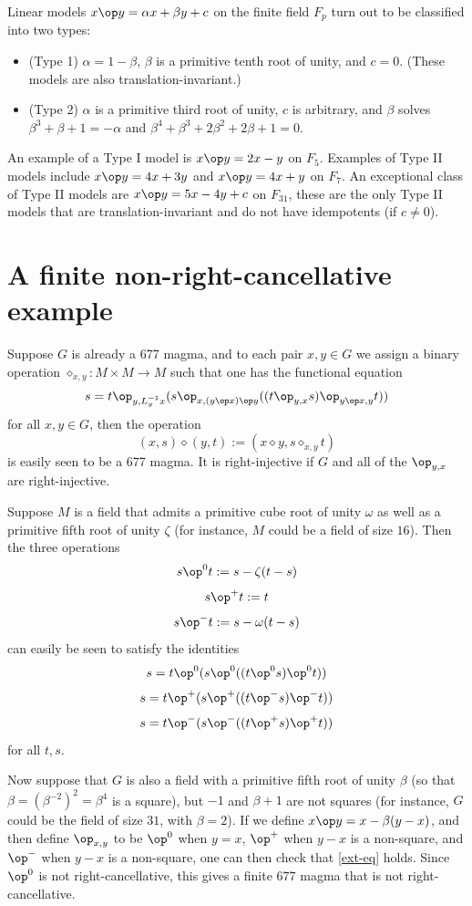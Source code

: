 Linear models $x \op y = \alpha x + \beta y + c$ on the finite field $F_p$ turn out to be classified into two types:
\begin{itemize}
\item (Type 1) $\alpha=1-\beta$, $\beta$ is a primitive tenth root of unity, and $c=0$.  (These models are also translation-invariant.)
\item (Type 2) $\alpha$ is a primitive third root of unity, $c$ is arbitrary, and $\beta$ solves $\beta^3+\beta+1=-\alpha$ and $\beta^4+\beta^3+2\beta^2+2\beta+1=0$.
\end{itemize}
An example of a Type I model is $x \op y = 2x-y$ on $F_5$.  Examples of Type II models include $x \op y = 4x+3y$ and $x \op y = 4x+y$ on $F_7$.  An exceptional class of Type II models are $x \op y = 5x-4y+c$ on $F_{31}$, these are the only Type II models that are translation-invariant and do not have idempotents (if $c \neq 0$).

\section{A finite non-right-cancellative example}

Suppose $G$ is already a 677 magma, and to each pair $x,y \in G$ we assign a binary operation $\diamond_{x,y}: M \times M \to M$ such that one has the functional equation
\begin{equation}\label{ext-eq}
  s = t \op_{y,L_y^{-1} x} (s \op_{x, (y \op x) \op y} ((t \op_{y,x} s) \op_{y \op x, y} t))
\end{equation}
for all $x,y \in G$, then the operation
$$ (x,s) \diamond (y,t) := (x \diamond y, s \diamond_{x,y} t)$$
is easily seen to be a 677 magma.  It is right-injective if $G$ and all of the $\op_{y,x}$ are right-injective.

Suppose $M$ is a field that admits a primitive cube root of unity $\omega$ as well as a primitive fifth root of unity $\zeta$ (for instance, $M$ could be a field of size $16$).  Then the three operations
$$ s \op^0 t := s - \zeta(t-s)$$
$$ s \op^+ t := t$$
$$ s \op^- t := s - \omega(t-s)$$
can easily be seen to satisfy the identities
$$s = t \op^0 (s \op^0 ((t \op^0 s) \op^0 t))$$
$$s = t \op^+ (s \op^+ ((t \op^- s) \op^- t))$$
$$s = t \op^- (s \op^- ((t \op^+ s) \op^+ t))$$
for all $t,s$.

Now suppose that $G$ is also a field with a primitive fifth root of unity $\beta$ (so that $\beta = \left(\beta^{-2}\right)^2 = \beta^4$ is a square), but $-1$ and $\beta+1$ are not squares (for instance, $G$ could be the field of size $31$, with $\beta=2$).  If we define $x \op y = x - \beta(y-x)$, and then define $\op_{x,y}$ to be $\op^0$ when $y=x$, $\op^+$ when $y-x$ is a non-square, and $\op^-$ when $y-x$ is a non-square, one can then check that \eqref{ext-eq} holds. Since $\op^0$ is not right-cancellative, this gives a finite 677 magma that is not right-cancellative.


